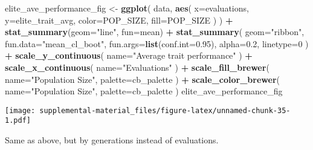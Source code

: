 \documentclass[]{book}
\newenvironment{Shaded}{\begin{snugshade}}{\end{snugshade}}
\newcommand{\DataTypeTok}[1]{\textcolor[rgb]{0.13,0.29,0.53}{#1}}
\newcommand{\DecValTok}[1]{\textcolor[rgb]{0.00,0.00,0.81}{#1}}
\newcommand{\FloatTok}[1]{\textcolor[rgb]{0.00,0.00,0.81}{#1}}
\newcommand{\KeywordTok}[1]{\textcolor[rgb]{0.13,0.29,0.53}{\textbf{#1}}}
\newcommand{\NormalTok}[1]{#1}
\newcommand{\OperatorTok}[1]{\textcolor[rgb]{0.81,0.36,0.00}{\textbf{#1}}}
\newcommand{\StringTok}[1]{\textcolor[rgb]{0.31,0.60,0.02}{#1}}
\begin{document}
\begin{Shaded}
\begin{Highlighting}[]
\NormalTok{elite_ave_performance_fig <-}
\StringTok{  }\KeywordTok{ggplot}\NormalTok{(}
\NormalTok{    data,}
    \KeywordTok{aes}\NormalTok{(}
      \DataTypeTok{x=}\NormalTok{evaluations,}
      \DataTypeTok{y=}\NormalTok{elite_trait_avg,}
      \DataTypeTok{color=}\NormalTok{POP_SIZE,}
      \DataTypeTok{fill=}\NormalTok{POP_SIZE}
\NormalTok{    )}
\NormalTok{  ) }\OperatorTok{+}
\StringTok{  }\KeywordTok{stat_summary}\NormalTok{(}\DataTypeTok{geom=}\StringTok{"line"}\NormalTok{, }\DataTypeTok{fun=}\NormalTok{mean) }\OperatorTok{+}
\StringTok{  }\KeywordTok{stat_summary}\NormalTok{(}
    \DataTypeTok{geom=}\StringTok{"ribbon"}\NormalTok{,}
    \DataTypeTok{fun.data=}\StringTok{"mean_cl_boot"}\NormalTok{,}
    \DataTypeTok{fun.args=}\KeywordTok{list}\NormalTok{(}\DataTypeTok{conf.int=}\FloatTok{0.95}\NormalTok{),}
    \DataTypeTok{alpha=}\FloatTok{0.2}\NormalTok{,}
    \DataTypeTok{linetype=}\DecValTok{0}
\NormalTok{  ) }\OperatorTok{+}
\StringTok{  }\KeywordTok{scale_y_continuous}\NormalTok{(}
    \DataTypeTok{name=}\StringTok{"Average trait performance"}
\NormalTok{  ) }\OperatorTok{+}
\StringTok{  }\KeywordTok{scale_x_continuous}\NormalTok{(}
    \DataTypeTok{name=}\StringTok{"Evaluations"}
\NormalTok{  ) }\OperatorTok{+}
\StringTok{  }\KeywordTok{scale_fill_brewer}\NormalTok{(}
    \DataTypeTok{name=}\StringTok{"Population Size"}\NormalTok{,}
    \DataTypeTok{palette=}\NormalTok{cb_palette}
\NormalTok{  ) }\OperatorTok{+}
\StringTok{  }\KeywordTok{scale_color_brewer}\NormalTok{(}
    \DataTypeTok{name=}\StringTok{"Population Size"}\NormalTok{,}
    \DataTypeTok{palette=}\NormalTok{cb_palette}
\NormalTok{  )}
\NormalTok{elite_ave_performance_fig}
\end{Highlighting}
\end{Shaded}

\texttt{[image: supplemental-material\_files/figure-latex/unnamed-chunk-35-1.pdf]}

Same as above, but by generations instead of evaluations.
\end{document}
